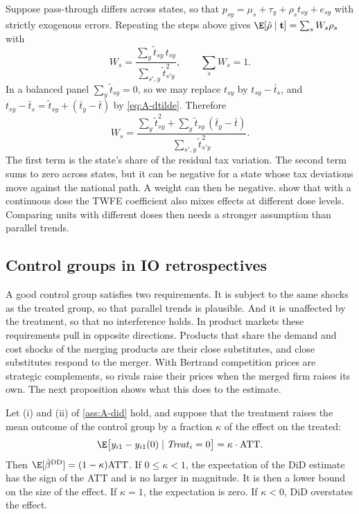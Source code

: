 \begin{remark}\label{rem:A-twfe-hetero}
Suppose pass-through differs across states, so that $p_{sy}=\mu_s+\tau_y+\rho_s t_{sy}+e_{sy}$ with strictly
exogenous errors. Repeating the steps above gives $\E[\hat\rho\mid\mathbf{t}]=\sum_sW_s\rho_s$ with
\begin{equation*}
W_s=\frac{\sum_y\tilde t_{sy}\,t_{sy}}{\sum_{s',y}\tilde t_{s'y}^2},\qquad \sum_sW_s=1 .
\end{equation*}
In a balanced panel $\sum_y\tilde t_{sy}=0$, so we may replace $t_{sy}$ by $t_{sy}-\bar t_s$, and
$t_{sy}-\bar t_s=\tilde t_{sy}+(\bar t_y-\bar t)$ by \eqref{eq:A-dtilde}. Therefore
\begin{equation*}
W_s=\frac{\sum_y\tilde t_{sy}^2+\sum_y\tilde t_{sy}\,(\bar t_y-\bar t)}{\sum_{s',y}\tilde t_{s'y}^2}.
\end{equation*}
The first term is the state's share of the residual tax variation. The second term sums to zero across states, but
it can be negative for a state whose tax deviations move against the national path. A weight can then be negative.
\citet{CallawayGoodmanBaconSantAnna2024} show that with a continuous dose the TWFE coefficient also mixes effects at
different dose levels. Comparing units with different doses then needs a stronger assumption than parallel trends.
\end{remark}

\subsection{Control groups in IO retrospectives}\label{sec:A-did-control}

A good control group satisfies two requirements. It is subject to the same shocks as the treated group, so that
parallel trends is plausible. And it is unaffected by the treatment, so that no interference holds. In product
markets these requirements pull in opposite directions. Products that share the demand and cost shocks of the
merging products are their close substitutes, and close substitutes respond to the merger. With Bertrand
competition prices are strategic complements, so rivals raise their prices when the merged firm raises its own.
The next proposition shows what this does to the estimate.

\begin{proposition}\label{prop:A-did-spillover}
Let (i) and (ii) of \cref{ass:A-did} hold, and suppose that the treatment raises the mean outcome of the control
group by a fraction $\kappa$ of the effect on the treated:
\begin{equation*}
\E\big[y_{i1}-y_{i1}(0)\mid\mathit{Treat}_i=0\big]=\kappa\cdot\mathrm{ATT}.
\end{equation*}
Then $\E[\hat\beta^{\mathrm{DD}}]=(1-\kappa)\mathrm{ATT}$. If $0\le\kappa<1$, the expectation of the DiD estimate has
the sign of the ATT and is no larger in magnitude. It is then a lower bound on the size of the effect. If $\kappa=1$,
the expectation is zero. If $\kappa<0$, DiD overstates the effect.
\end{proposition}


